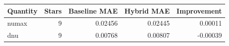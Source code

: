 \begin{tabular}{lrrrr}
Quantity & Stars & Baseline MAE & Hybrid MAE & Improvement \\
\hline
numax & 9 & 0.02456 & 0.02445 & 0.00011 \\
dnu & 9 & 0.00768 & 0.00807 & -0.00039 \\
\end{tabular}
